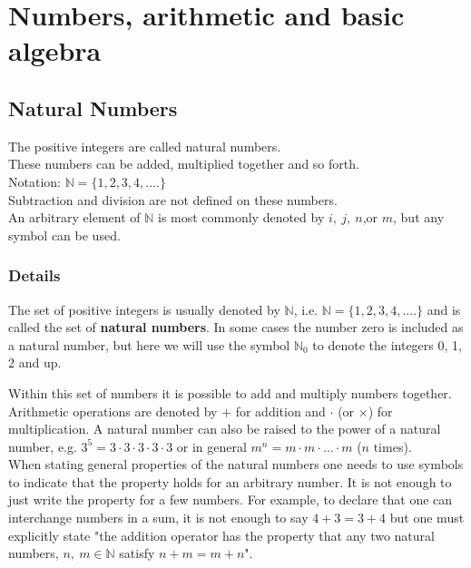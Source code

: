\documentclass[12pt,a4paper]{article}
\theoremstyle{regla}
\theoremstyle{remark}
\theoremstyle{definition}
\theoremstyle{nonumberbreak}
\begin{document}
\newpage
\tableofcontents
\newpage
\section{Numbers, arithmetic and basic algebra}
\subsection{Natural Numbers}
\begin{fbox}
\begin{minipage}{0.97\textwidth}
The positive integers are called natural numbers.\\

These numbers can be added, multiplied together and so forth.\\

Notation: $\mathbb{N}=\{1,2,3,4,....\}$ \\

Subtraction and division are not defined on these numbers.\\

An arbitrary element of $\mathbb{N}$ is most commonly denoted by $i,\ j,\ n$,or $m$, but any symbol can be used. \\
\end{minipage}
\end{fbox}
\subsubsection{Details}
\begin{defn}
The set of positive integers is usually denoted by $\mathbb{N}$, i.e.
$\mathbb{N}=\{1,2,3,4,....\}$ and is called the set of \textbf{natural numbers}. In some cases the number zero is included as a natural number, but here we will use the symbol $\mathbb{N}_0$ to denote the integers 0, 1, 2 and up.
\end{defn}

Within this set of numbers it is possible to add and multiply numbers together. Arithmetic operations are denoted by $+$ for addition and $\cdot$ (or $\times$) for multiplication. A natural number can also be raised to the power of a natural number, e.g. $3^5=3\cdot 3\cdot 3\cdot 3\cdot 3$ 
or in general $m^n=m\cdot m \cdot \ldots \cdot m$ ($n$ times).\\

When stating general properties of the natural numbers one needs to use symbols to indicate that the property holds for an arbitrary number. It is not enough to just write the property for a few numbers. For example, to declare that one can interchange numbers in a sum, it is not enough to say $4+3=3+4$ but one must explicitly state "the addition operator has the property that any two natural numbers, $n,\ m\in \mathbb{N}$ satisfy $n+m=m+n$".\\
\end{document}
